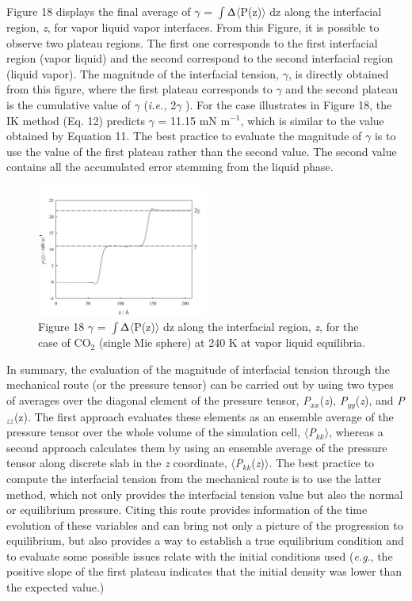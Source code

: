 \documentclass[9pt,bestpractices]{livecoms}
\begin{document}
Figure 18 displays the final average of ${\gamma}$
= ${\int}$${\Updelta}$${\langle}$P(z)${\rangle}$ dz along the interfacial
region, \textit{z}, for vapor \textendash{} liquid \textendash{} vapor
interfaces. From this Figure, it is possible to observe two plateau regions.
The first one corresponds to the first interfacial region (vapor \textendash{}
liquid) and the second correspond to the second interfacial region (liquid
\textendash{} vapor). The magnitude of the interfacial tension, ${\gamma}$, is
directly obtained from this figure, where the first plateau corresponds to
${\gamma}$ and the second plateau is the cumulative value of ${\gamma}$
(\textit{i.e.,} 2${\gamma}$ ). For the case illustrates in Figure 18, the IK
method (Eq. 12) predicts ${\gamma}$ = 11.15 mN m$^{-1}$, which is similar to
the value obtained by Equation 11.
The best practice to evaluate the magnitude of ${\gamma}$ is to use the value
of the first plateau rather than the second value. The second value contains
all the accumulated error stemming from the liquid phase.
\begin{figure}
\includegraphics[width=0.5\textwidth]{gfx/image63.jpeg}
\caption{Figure 18 ${\gamma}$ = ${\int}$${\Updelta}$${\langle}$P(z)${\rangle}$ dz along the interfacial region, \textit{z}, for the case of CO$_{2}$ (single Mie sphere) at 240 K at vapor \textendash{} liquid equilibria.}
\label{fig:18}
\end{figure}

In summary, the evaluation of the magnitude of interfacial tension through the
mechanical route (or the pressure tensor) can be carried out by using two types
of averages over the diagonal element of the pressure tensor,
\textit{P}$_{xx}$(\textit{z}), \textit{P}$_{yy}$(\textit{z}), and
\textit{P}$_{zz}$(z). The first approach evaluates these elements as an
ensemble average of the pressure tensor over the whole volume of the simulation
cell, ${\langle}$\textit{P}$_{kk}$${\rangle}$, whereas a second approach
calculates them by using an ensemble average of the pressure tensor along
discrete slab in the \textit{z} coordinate,
${\langle}$\textit{P}$_{kk}$(\textit{z})${\rangle}$. The best practice to
compute the interfacial tension from the mechanical route is to use the latter 
method, which not only provides the interfacial tension value but also the
normal or equilibrium pressure. Citing \citet{holcomb1993} this route provides information of the time
evolution of these variables and can bring not only a picture of the
progression to equilibrium,  but also provides a way to establish a true
equilibrium condition and to evaluate some possible issues relate with the
initial conditions used (\textit{e.g}., the positive slope of the first plateau
indicates that the initial density was lower than the expected value.) 
\end{document}
